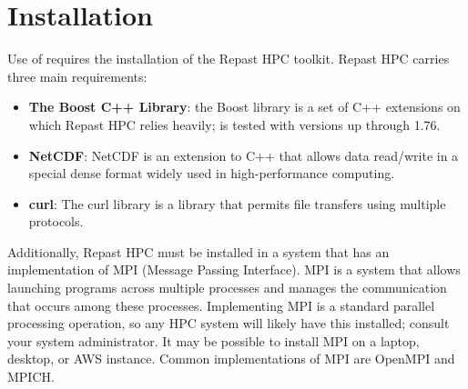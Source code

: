 
\chapter{Installation} \label{chap:Installation}



Use of \rhpc requires the installation of the Repast HPC toolkit. Repast HPC carries three main requirements:

\begin{itemize} 
   \item \textbf{The Boost C++ Library}: the Boost library is a set of C++ extensions on which Repast HPC relies heavily; \rhpc is tested with versions up through 1.76.
   \item \textbf{NetCDF}: NetCDF is an extension to C++ that allows data read/write in a special dense format widely used in high-performance computing.
   \item \textbf{curl}: The curl library is a library that permits file transfers using multiple protocols.
\end{itemize}

Additionally, Repast HPC must be installed in a system that has an implementation of MPI (Message Passing Interface). MPI is a system that allows launching programs across multiple processes and manages the communication that occurs among these processes. Implementing MPI is a standard parallel processing operation, so any HPC system will likely have this installed; consult your system administrator. %
It may be possible to install MPI on a laptop, desktop, or AWS instance. Common implementations of MPI are OpenMPI and MPICH. 

